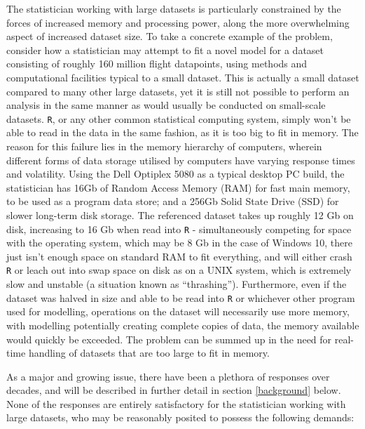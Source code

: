 The statistician working with large datasets is particularly constrained by the forces of increased memory and processing power, along the more overwhelming aspect of increased dataset size.
To take a concrete example of the problem, consider how a statistician may attempt to fit a novel model for a dataset consisting of roughly 160 million flight datapoints\cite{bot2009flights}, using methods and computational facilities typical to a small dataset.
This is actually a small dataset compared to many other large datasets, yet it is still not possible to perform an analysis in the same manner as would usually be conducted on small-scale datasets.
\texttt{R}, or any other common statistical computing system, simply won't be able to read in the data in the same fashion, as it is too big to fit in memory.
The reason for this failure lies in the memory hierarchy of computers, wherein different forms of data storage utilised by computers have varying response times and volatility.
Using the Dell Optiplex 5080 as a typical desktop PC build, the statistician has 16Gb of Random Access Memory (RAM) for fast main memory, to be used as a program data store; and a 256Gb Solid State Drive (SSD) for slower long-term disk  storage\cite{cornell2021standardcomp}.
The referenced dataset takes up roughly 12 Gb on disk, increasing to 16 Gb when read into \texttt{R} - simultaneously competing for space with the operating system, which may be 8 Gb in the case of Windows 10, there just isn't enough space on standard RAM to fit everything, and will either crash \texttt{R} or leach out into swap space on disk as on a UNIX system, which is extremely slow and unstable (a situation known as ``thrashing'')\cite{denning1968thrashing}.
Furthermore, even if the dataset was halved in size and able to be read into \texttt{R} or whichever other program used for modelling, operations on the dataset will necessarily use more memory, with modelling potentially creating complete copies of data, the memory available would quickly be exceeded.
The problem can be summed up in the need for real-time handling of datasets that are too large to fit in memory.

As a major and growing issue, there have been a plethora of responses over decades, and will be described in further detail in section \ref{background} below.
None of the responses are entirely satisfactory for the statistician working with large datasets, who may be reasonably posited to possess the following demands:

